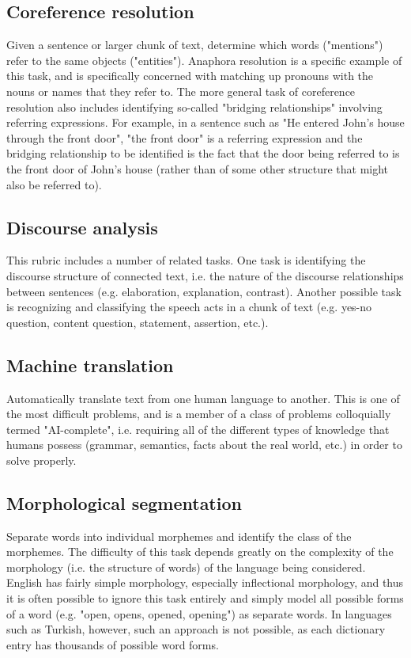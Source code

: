 \documentclass[12pt]{book}
\begin{document}
\subsection{Coreference resolution}
Given a sentence or larger chunk of text, determine which words ("mentions") refer to the same objects ("entities"). Anaphora resolution is a specific example of this task, and is specifically concerned with matching up pronouns with the nouns or names that they refer to. The more general task of coreference resolution also includes identifying so-called "bridging relationships" involving referring expressions. For example, in a sentence such as "He entered John's house through the front door", "the front door" is a referring expression and the bridging relationship to be identified is the fact that the door being referred to is the front door of John's house (rather than of some other structure that might also be referred to).
\subsection{Discourse analysis}
This rubric includes a number of related tasks. One task is identifying the discourse structure of connected text, i.e. the nature of the discourse relationships between sentences (e.g. elaboration, explanation, contrast). Another possible task is recognizing and classifying the speech acts in a chunk of text (e.g. yes-no question, content question, statement, assertion, etc.).
\subsection{Machine translation}
Automatically translate text from one human language to another. This is one of the most difficult problems, and is a member of a class of problems colloquially termed "AI-complete", i.e. requiring all of the different types of knowledge that humans possess (grammar, semantics, facts about the real world, etc.) in order to solve properly.
\subsection{Morphological segmentation}
Separate words into individual morphemes and identify the class of the morphemes. The difficulty of this task depends greatly on the complexity of the morphology (i.e. the structure of words) of the language being considered. English has fairly simple morphology, especially inflectional morphology, and thus it is often possible to ignore this task entirely and simply model all possible forms of a word (e.g. "open, opens, opened, opening") as separate words. In languages such as Turkish, however, such an approach is not possible, as each dictionary entry has thousands of possible word forms.
\end{document}
